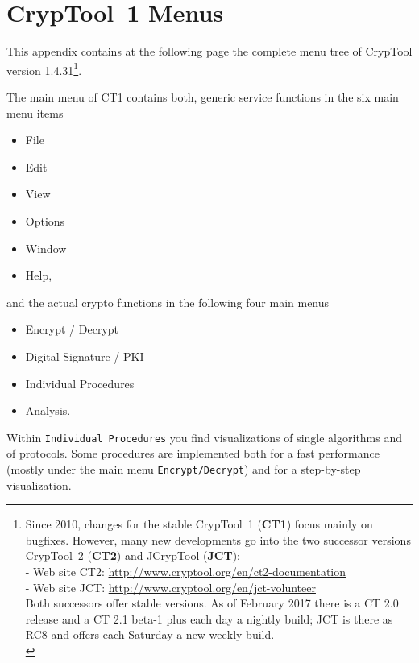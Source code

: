 
\newpage
\hypertarget{appendix-menu-overview-CT1}{}
\section{CrypTool~1 Menus}
\label{s:appendix-menu-overview-CT1}

This appendix contains at the following page the complete menu tree of
CrypTool version 1.4.31\footnote{%
  Since 2010, changes for the stable CrypTool~1 ({\bf CT1})
  focus mainly on bugfixes. However, many new developments go into the two
  successor versions CrypTool~2 ({\bf CT2}) and
  JCrypTool ({\bf JCT}):\\
  - Web site CT2: \url{http://www.cryptool.org/en/ct2-documentation} \\
  - Web site JCT: \url{http://www.cryptool.org/en/jct-volunteer} \\
  Both successors offer stable versions.
  As of February 2017 there is a CT 2.0 release and a CT 2.1 beta-1
  plus each day a nightly build; JCT is there as RC8 and offers each
  Saturday a new weekly build.\\
}. 

\noindent The main menu of CT1 contains both, generic service functions in the
six main menu items
\begin{itemize}
   \item File
   \item Edit
   \item View
   \item Options
   \item Window
   \item Help,
\end{itemize}
and the actual crypto functions in the following four main menus
\begin{itemize}
   \item Encrypt / Decrypt
   \item Digital Signature / PKI
   \item Individual Procedures
   \item Analysis.
\end{itemize}

Within \verb#Individual Procedures# you find visualizations of single algorithms
and of protocols. Some procedures are implemented both for a fast performance
(mostly under the main menu \verb#Encrypt/Decrypt#) and for a step-by-step visualization.

